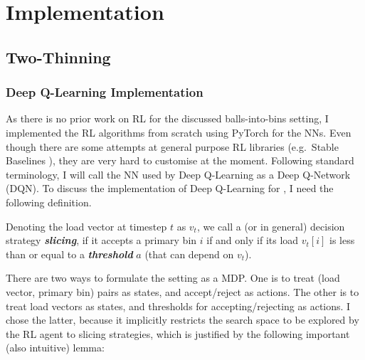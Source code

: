 \chapter{Implementation}\label{implementation}

\ifpdf
    \graphicspath{{Chapter3/Figs/Raster/}{Chapter3/Figs/PDF/}{Chapter3/Figs/}}
\else
    \graphicspath{{Chapter3/Figs/Vector/}{Chapter3/Figs/}}
\fi



\section{Two-Thinning}





\subsection{Deep Q-Learning Implementation}


As there is no prior work on RL for the discussed balls-into-bins setting, I implemented the RL algorithms from scratch using PyTorch for the NNs. Even though there are some attempts at general purpose RL libraries (e.g.\ Stable Baselines \cite{hill2018stablebaselines}), they are very hard to customise at the moment. Following standard terminology, I will call the NN used by Deep Q-Learning as a Deep Q-Network (DQN). To discuss the implementation of Deep Q-Learning for \TwoThinning, I need the following definition.



\begin{definition} 
Denoting the load vector at timestep $t$ as $v_t$, we call a \TwoThinning (or \KThinning in general) decision strategy \textit{\textbf{slicing}}, if it accepts a primary bin $i$ if and only if its load $v_t[i]$ is less than or equal to a \textit{\textbf{threshold}} $a$ (that can depend on $v_t$).
\end{definition}


There are two ways to formulate the \TwoThinning setting as a MDP. One is to treat (load vector, primary bin) pairs as states, and accept/reject as actions. The other is to treat load vectors as states, and thresholds for accepting/rejecting as actions. I chose the latter, because it implicitly restricts the search space to be explored by the RL agent to slicing strategies, which is justified by the following important (also intuitive) lemma:


